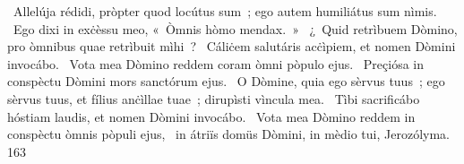 {~Allelúja}
{%
rédidi, pròpter quod locútus sum~; ego autem humiliátus sum nìmis.
~Ego dixi in exċèssu meo, «~Òmnis hòmo mendax.~»
~¿~Quid retrìbuem Dòmino, pro òmnibus quae retrìbuit mìhi~?
~Cáliċem salutáris acċìpiem, et nomen Dòmini invocábo.
~Vota mea Dòmino reddem coram òmni pòpulo ejus.
~Preçiósa in conspèctu Dòmini mors sanctórum ejus.
~O Dòmine, quia ego sèrvus tuus~; ego sèrvus tuus, et fílius anċìllae tuae~; dirupìsti vìncula mea.
~Tìbi sacrificábo hóstiam laudis, et nomen Dòmini invocábo.
~Vota mea Dòmino reddem in conspèctu òmnis pòpuli ejus,
~in átriïs domüs Dòmini, in mèdio tui, Jerozólyma.}
{16}{3}
